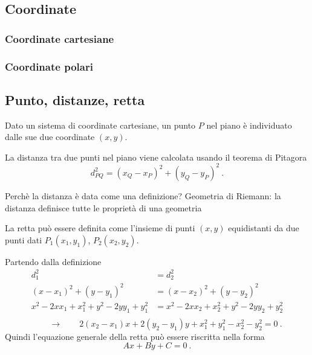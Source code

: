 \subsection{Coordinate}
\subsubsection{Coordinate cartesiane}
\subsubsection{Coordinate polari}
\subsection{Punto, distanze, retta}
\begin{definition}[Punto]
Dato un sistema di coordinate cartesiane, un punto $P$ nel piano è individuato dalle sue due coordinate $(x,y)$.
\end{definition}
\begin{definition}
La distanza tra due punti nel piano viene calcolata usando il teorema di Pitagora
\begin{equation}
    d_{PQ}^2 = (x_Q - x_P)^2 + (y_Q - y_P)^2 \ .
\end{equation}
\end{definition}
{\color{red} Perchè la distanza è data come una definizione? Geometria di Riemann: la distanza definisce tutte le proprietà di una geometria}

\begin{definition}[Retta]
    La retta può essere definita come l'insieme di punti $(x,y)$ equidistanti da due punti dati $P_1(x_1,y_1)$, $P_2(x_2,y_2)$.
\end{definition}
Partendo dalla definizione
\begin{equation}
\begin{aligned}
    d_1^2 & = d_2^2 \\
    (x - x_1)^2 + (y-y_1)^2 & = (x - x_2)^2 + (y-y_2)^2 \\
    x^2 - 2 x x_1 + x_1^2 + y^2 - 2 y y_1 + y_1^2 & = x^2 - 2 x x_2 + x_2^2 + y^2 - 2 y y_2 + y_2^2 \\
\end{aligned}
\end{equation}
\begin{equation}
  \qquad \rightarrow \qquad 2(x_2 - x_1) x + 2(y_2 - y_1) y + x_1^2 + y_1^2 - x_2^2 - y_2^2 = 0 \ .
\end{equation}
Quindi l'equazione generale della retta può essere riscritta nella forma
\begin{equation}
    A x + B y + C = 0 \ .
\end{equation}


